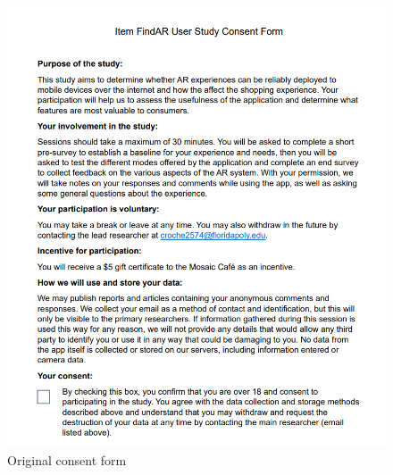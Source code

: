 \documentclass[thesis]{fputhesis}
\begin{document}
\begin{body}
\begin{appendices}
\begin{figure}[h]
    \centering
    \includegraphics[width=0.85\linewidth]{Images/consent form.png}
    \caption{Original consent form}
    \label{fig:consent-form}
\end{figure}
\end{appendices}
\end{body}
\end{document}
